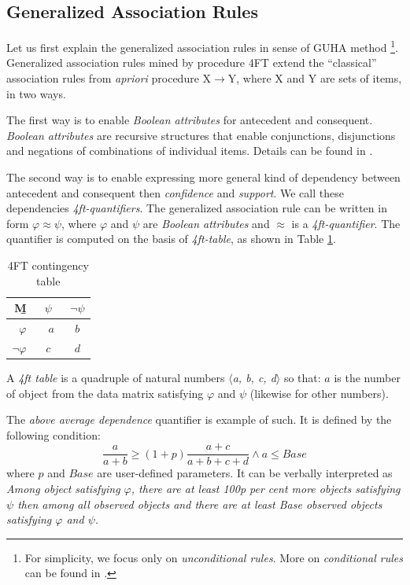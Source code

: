 \documentclass[conference]{IEEEtran}
\begin{document}
\subsection{Generalized Association Rules}
\label{section:generalized}
Let us first explain the generalized association rules in sense of GUHA method
\cite{Rauch1,Rauch2,Alternative}\footnote{For simplicity, we focus only on 
\emph{unconditional rules}. More on \emph{conditional rules} can be found in 
\cite{Rauch2}.}. Generalized association rules mined by procedure 4FT \cite{Alternative}
extend the ``classical'' association rules from \emph{apriori} procedure
X$\rightarrow$Y, where X and Y are sets of items, in two ways. 

The first way is to
enable \emph{Boolean attributes} for antecedent and consequent. \emph{Boolean attributes}
are recursive structures that enable conjunctions, disjunctions and negations of
combinations of individual items. Details can be found in \cite{Ralbovsky}.

The second way is to enable expressing more general kind of dependency between 
antecedent and consequent then \emph{confidence} and \emph{support}. We call these 
dependencies \emph{4ft-quantifiers}. The generalized association rule can be written
in form \mbox{$\varphi \approx \psi$}, where $\varphi$ and $\psi$ are 
\emph{Boolean attributes} and $\approx$ is a \emph{4ft-quantifier}.
The quantifier is computed on the basis of \emph{4ft-table}, as shown in 
Table \ref{table:4FTcontingency}.

\begin{table}[ht]
	\begin{center}
		\begin{tabular}{r|c|c}
		{\b M}        & $ \psi $ &  $ \neg \psi $ \\
		\hline
		     $  \varphi $  &  \ \ $ a  \ \ $    & $  \ \ b \ \  $    \\
		\hline
		   $ \neg \varphi $  &  $ c $    & $ d $    \\
		\end {tabular}
	\end{center}
	\caption{4FT contingency table}
	\label{table:4FTcontingency}
\end{table}

A \emph{4ft table} is a quadruple of natural numbers 
\emph{$\langle$a, b, c, d$\rangle$}
so that: $a$ is the number of object from the data matrix satisfying $\varphi$ and 
$\psi$ (likewise for other numbers). 

The \emph{above average dependence} quantifier is example of such. It is defined 
by the following condition:
$$\frac{a}{a+b}\geq(1+p)\frac{a+c}{a+b+c+d} \wedge a \leq Base$$
where $p$ and $Base$ are user-defined parameters. It can be verbally interpreted
as \emph{Among object satisfying $\varphi$, there are at least 100p per cent 
more objects satisfying $\psi$ then among all observed objects and there are
at least Base observed objects satisfying $\varphi$ and $\psi$.}
\end{document}
